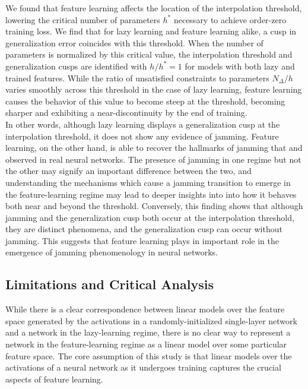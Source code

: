 \documentclass[11pt]{article}
\begin{document}
We found that feature learning affects the location of the interpolation threshold, lowering the critical number of parameters $h^*$ necessary to achieve order-zero training loss. We find that for lazy learning and feature learning alike, a cusp in generalization error coincides with this threshold. When the number of parameters is normalized by this critical value, the interpolation threshold and generalization cusps are identified with $h/h^* = 1$ for models with both lazy and trained features. While the ratio of unsatisfied constraints to parameters $N_\Delta/h$ varies smoothly across this threshold in the case of lazy learning, feature learning causes the behavior of this value to become steep at the threshold, becoming sharper and exhibiting a near-discontinuity by the end of training.\\

In other words, although lazy learning displays a generalization cusp at the interpolation threshold, it does not show any evidence of jamming. Feature learning, on the other hand, is able to recover the hallmarks of jamming that \cite{geigerJammingTransitionParadigm2019} and \cite{spiglerJammingTransitionOverparametrization2019} observed in real neural networks. The presence of jamming in one regime but not the other may signify an important difference between the two, and understanding the mechanisms which cause a jamming transition to emerge in the feature-learning regime may lead to deeper insights into into how it behaves both near and beyond the threshold. Conversely, this finding shows that although jamming and the generalization cusp both occur at the interpolation threshold, they are distinct phenomena, and the generalization cusp can occur without jamming. This suggests that feature learning plays in important role in the emergence of jamming phenomenology in neural networks. \\

\subsection{Limitations and Critical Analysis}

While there is a clear correspondence between linear models over the feature space generated by the activations in a randomly-initialized single-layer network and a network in the lazy-learning regime, there is no clear way to represent a network in the feature-learning regime as a linear model over some particular feature space. The core assumption of this study is that linear models over the activations of a neural network as it undergoes training captures the crucial aspects of feature learning. \\
\end{document}
